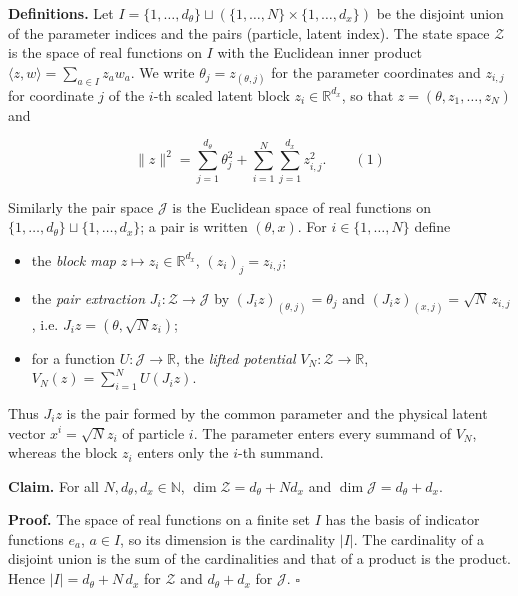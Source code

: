 \documentclass[11pt,a4paper]{report}
\begin{document}
\textbf{Definitions.} Let \(I=\{1,\dots,d_\theta\}\sqcup(\{1,\dots,N\}\times\{1,\dots,d_x\})\) be the disjoint union of the parameter indices and the pairs (particle, latent index). The state space \(\mathcal Z\) is the space of real functions on \(I\) with the Euclidean inner product \(\langle z,w\rangle=\sum_{a\in I}z_aw_a\). We write \(\theta_j=z_{(\theta,j)}\) for the parameter coordinates and \(z_{i,j}\) for coordinate \(j\) of the \(i\)-th scaled latent block \(z_i\in\mathbb R^{d_x}\), so that \(z=(\theta,z_1,\dots,z_N)\) and


\[\|z\|^2=\sum_{j=1}^{d_\theta}\theta_j^2+\sum_{i=1}^N\sum_{j=1}^{d_x}z_{i,j}^2 .\qquad(1)\]


Similarly the pair space \(\mathcal J\) is the Euclidean space of real functions on \(\{1,\dots,d_\theta\}\sqcup\{1,\dots,d_x\}\); a pair is written \((\theta,x)\). For \(i\in\{1,\dots,N\}\) define



\begin{itemize}


\item the \emph{block map} \(z\mapsto z_i\in\mathbb R^{d_x}\), \((z_i)_j=z_{i,j}\);

\item the \emph{pair extraction} \(J_i:\mathcal Z\to\mathcal J\) by \((J_iz)_{(\theta,j)}=\theta_j\) and \((J_iz)_{(x,j)}=\sqrt N\,z_{i,j}\), i.e. \(J_iz=(\theta,\sqrt Nz_i)\);

\item for a function \(U:\mathcal J\to\mathbb R\), the \emph{lifted potential} \(V_N:\mathcal Z\to\mathbb R\), \(V_N(z)=\sum_{i=1}^NU(J_iz)\).

\end{itemize}



Thus \(J_iz\) is the pair formed by the common parameter and the physical latent vector \(x^i=\sqrt Nz_i\) of particle \(i\). The parameter enters every summand of \(V_N\), whereas the block \(z_i\) enters only the \(i\)-th summand.




\textbf{Claim.} For all \(N,d_\theta,d_x\in\mathbb N\), \(\dim\mathcal Z=d_\theta+Nd_x\) and \(\dim\mathcal J=d_\theta+d_x\).




\textbf{Proof.} The space of real functions on a finite set \(I\) has the basis of indicator functions \(e_a\), \(a\in I\), so its dimension is the cardinality \(|I|\). The cardinality of a disjoint union is the sum of the cardinalities and that of a product is the product. Hence \(|I|=d_\theta+N\,d_x\) for \(\mathcal Z\) and \(d_\theta+d_x\) for \(\mathcal J\). \(\square\)
\end{document}
